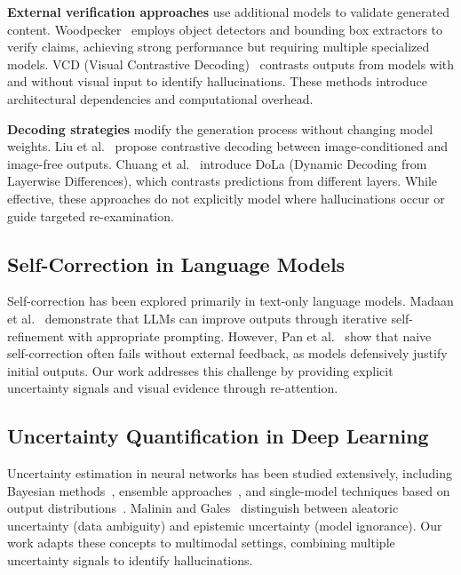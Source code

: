 \documentclass[12pt]{article}
\begin{document}
\vspace{1em}

\textbf{External verification approaches} use additional models to validate generated content. Woodpecker~\citep{yin2023woodpecker} employs object detectors and bounding box extractors to verify claims, achieving strong performance but requiring multiple specialized models. VCD (Visual Contrastive Decoding)~\citep{leng2023mitigating} contrasts outputs from models with and without visual input to identify hallucinations. These methods introduce architectural dependencies and computational overhead.

\vspace{1em}

\textbf{Decoding strategies} modify the generation process without changing model weights. Liu et al.~\citep{liu2024lcd} propose contrastive decoding between image-conditioned and image-free outputs. Chuang et al.~\citep{chuang2023dola} introduce DoLa (Dynamic Decoding from Layerwise Differences), which contrasts predictions from different layers. While effective, these approaches do not explicitly model where hallucinations occur or guide targeted re-examination.

\subsection{Self-Correction in Language Models}

Self-correction has been explored primarily in text-only language models. Madaan et al.~\citep{madaan2023selfrefine} demonstrate that LLMs can improve outputs through iterative self-refinement with appropriate prompting. However, Pan et al.~\citep{pan2024selfcorrection} show that naive self-correction often fails without external feedback, as models defensively justify initial outputs. Our work addresses this challenge by providing explicit uncertainty signals and visual evidence through re-attention.

\subsection{Uncertainty Quantification in Deep Learning}

Uncertainty estimation in neural networks has been studied extensively, including Bayesian methods~\citep{gal2016dropout}, ensemble approaches~\citep{lakshminarayanan2017simple}, and single-model techniques based on output distributions~\citep{guo2017calibration}. Malinin and Gales~\citep{malinin2018predictive} distinguish between aleatoric uncertainty (data ambiguity) and epistemic uncertainty (model ignorance). Our work adapts these concepts to multimodal settings, combining multiple uncertainty signals to identify hallucinations.
\end{document}
